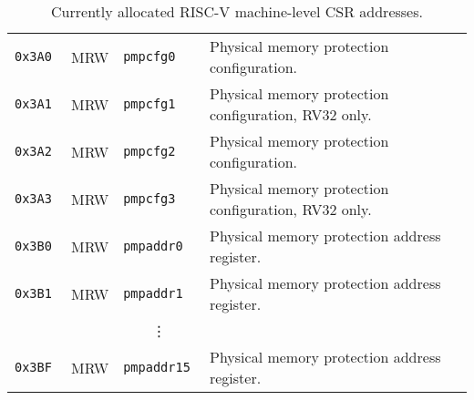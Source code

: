 \begin{table}[htb!]
\begin{center}
\begin{tabular}{|l|l|l|l|}
\tt 0x3A0 & MRW  &\tt pmpcfg0    & Physical memory protection configuration. \\
\tt 0x3A1 & MRW  &\tt pmpcfg1    & Physical memory protection configuration, RV32 only. \\
\tt 0x3A2 & MRW  &\tt pmpcfg2    & Physical memory protection configuration. \\
\tt 0x3A3 & MRW  &\tt pmpcfg3    & Physical memory protection configuration, RV32 only. \\
\tt 0x3B0 & MRW  &\tt pmpaddr0   & Physical memory protection address register. \\
\tt 0x3B1 & MRW  &\tt pmpaddr1   & Physical memory protection address register. \\
& & \multicolumn{1}{c|}{\vdots} & \ \\
\tt 0x3BF & MRW  &\tt pmpaddr15  & Physical memory protection address register. \\
\hline
\end{tabular}
\end{center}
\caption{Currently allocated RISC-V machine-level CSR addresses.}
\label{mcsrnames0}
\end{table}

